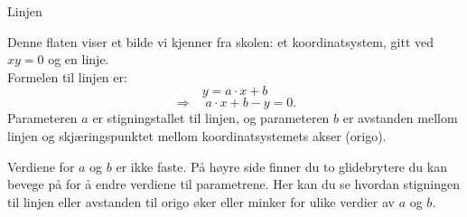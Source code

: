 \documentclass[no]{./../../common/SurferDesc}%
\begin{document}
\footnotesize
%
 
\begin{surferPage}
  \begin{surferTitle}Linjen\end{surferTitle}
   \begin{surferText}
   
Denne flaten viser et bilde vi kjenner fra skolen: et koordinatsystem, gitt ved $xy=0$ og en linje. \\Formelen til linjen er:
\[y=a\cdot x + b\]
\[ \Rightarrow \quad a\cdot x +b -y=0.\]
Parameteren $a$ er stigningstallet til linjen, og parameteren $b$ er avstanden mellom linjen og skjæringspunktet mellom koordinatsystemets akser (origo). 
\newline

Verdiene for $a$ og $b$ er ikke faste. På høyre side finner du to glidebrytere du kan bevege på 
for å endre verdiene til parametrene. Her kan du se hvordan stigningen til linjen eller avstanden 
til origo øker eller minker for ulike verdier av $a$ og $b$.
     \end{surferText}
\end{surferPage}
\end{document}
